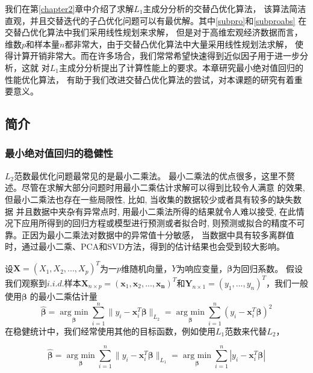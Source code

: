 我们在第\ref{chapter2}章中介绍了求解$L_1$主成分分析的交替凸优化算法，
该算法简洁直观，并且交替迭代的子凸优化问题可以有最优解。其中\eqref{subpro}和\eqref{subproabs}
在交替凸优化算法中我们采用线性规划来求解，
但是对于高维宏观经济数据而言，维数$p$和样本量$n$都非常大，由于交替凸优化算法中大量采用线性规划法求解，
使得计算开销非常大。而在许多场合，我们常常希望快速得到近似因子用于进一步分析，这就
对$L_1$主成分分析提出了计算性能上的要求。本章研究最小绝对值回归的性能优化算法，
有助于我们改进交替凸优化算法的尝试，对本课题的研究有着重要意义。


\subsection{简介}
\subsubsection{最小绝对值回归的稳健性}

$L_2$范数最优化问题最常见的是最小二乘法。
最小二乘法的优点很多，这里不赘述。尽管在求解大部分问题时用最小二乘估计求解可以得到比较令人满意
的效果, 但最小二乘法也存在一些局限性, 比如, 当收集的数据较少或者具有较多的缺失数据
并且数据中夹杂有异常点时, 用最小二乘法所得的结果就令人难以接受, 在此情况下应用所得到的回归方程或模型进行预测或者拟合时, 
则预测或拟合的精度不可靠。正因为最小二乘法对数据中的异常值十分敏感，
当数据中具有较多离群值时，通过最小二乘、PCA和SVD方法，得到的估计结果也会受到较大影响。

设$\bm{X} = (X_1, X_2, ..., X_p)^T$为一$p$维随机向量，$Y$为响应变量，$\bm{\beta}$为回归系数。
假设我们观察到$i.i.d. $样本$\bm{X}_{n\times p} = (\bm{x}_1, \bm{x}_2, ..., \bm{x_n})^T$和$\bm{Y}_{n\times1}=
(y_1, ..., y_n)^T$，我们一般使用$\bm{\beta}$
的最小二乘估计量
\begin{equation}\label{l2loss}
\hat{\bm{\beta}} = \underset{\bm{\beta}}{\operatorname{arg\ min}} \sum_{i=1}^n\|y_i - \bm{x}^T_i\bm{\beta}\|_{L_2}
=\underset{\bm{\beta}}{\operatorname{arg\ min}} \sum_{i=1}^n(y_i - \bm{x}^T_i\bm{\beta})^2
\end{equation}
在稳健统计中，我们经常使用其他的目标函数，例如使用$L_1$范数来代替$L_2$，

\begin{equation}\label{l1loss}
\hat{\bm{\beta}} = \underset{\bm{\beta}}{\operatorname{arg\ min}} \sum_{i=1}^n\|y_i - \bm{x}^T_i\bm{\beta}\|_{L_1}
=\underset{\bm{\beta}}{\operatorname{arg\ min}} \sum_{i=1}^n|y_i - \bm{x}^T_i\bm{\beta}|
\end{equation}

